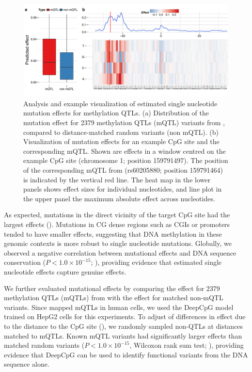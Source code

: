 \begin{figure}[htbp!]
\centering
\includegraphics[width=1.0\textwidth]{mut_qtl_zoom}
\caption[Analysis and example visualization of estimated single nucleotide mutation effects for methylation QTLs.]{Analysis and example visualization of estimated single nucleotide mutation effects for methylation QTLs. (a) Distribution of the mutation effect for 2379 methylation QTLs (mQTL) variants from \citet{kaplow_pooling-based_2015}, compared to distance-matched random variants (non mQTL). (b) Visualization of mutation effects for an example CpG site and the corresponding mQTL. Shown are effects in a window centred on the example CpG site (chromosome 1; position 159791497). The position of the corresponding mQTL from \citet{kaplow_pooling-based_2015} (rs60205880; position 159791464) is indicated by the vertical red line. The heat map in the lower panels shows effect sizes for individual nucleotides, and line plot in the upper panel the maximum absolute effect across nucleotides.}
\label{fig:dcpg_mut_qtl_zoom}
\end{figure}

As expected, mutations in the direct vicinity of the target CpG site had the largest effects (). Mutations in CG dense regions such as CGIs or promoters tended to have smaller effects, suggesting that DNA methylation in these genomic contexts is more robust to single nucleotide mutations. Globally, we observed a negative correlation between mutational effects and DNA sequence conservation ($P<1.0\times10^{-15}$; ), providing evidence that estimated single nucleotide effects capture genuine effects.

We further evaluated mutational effects by comparing the effect for 2379 methylation QTLs (mQTLs) from \citet{kaplow_pooling-based_2015} with the effect for matched non-mQTL variants. Since \citet{kaplow_pooling-based_2015} mapped mQTLs in human cells, we used the DeepCpG model trained on HepG2 cells for this experiments. To adjust of differences in effect due to the distance to the CpG site (), we randomly sampled non-QTLs at distances matched to mQTLs. Known mQTL variants had significantly larger effects than matched random variants ($P<1.0\times10^{-15}$, Wilcoxon rank sum test; ), providing evidence that DeepCpG can be used to identify functional variants from the DNA sequence alone.


